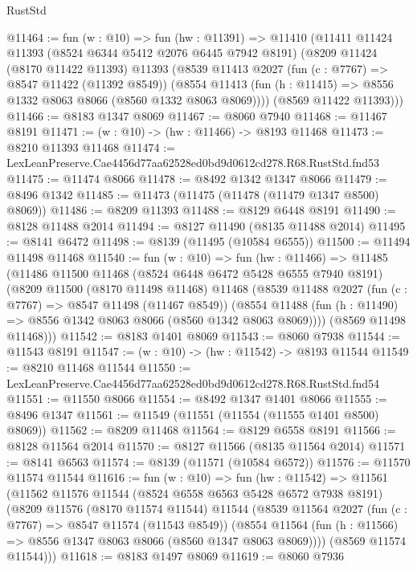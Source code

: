 \begin{lexlean}{RustStd}
\begin{coremodule}
@11464 := fun (w : @10) =>
  fun (hw : @11391) =>
  @11410
    (@11411
      @11424
      @11393
      (@8524 @6344 @5412 @2076 @6445 @7942 @8191)
      (@8209
        @11424
        (@8170 @11422 @11393)
        @11393
        (@8539
          @11413
          @2027
          (fun (c : @7767) => @8547 @11422 (@11392 @8549))
          (@8554 @11413 (fun (h : @11415) => @8556 @1332 @8063 @8066 (@8560 @1332 @8063 @8069))))
        (@8569 @11422 @11393)))
@11466 := @8183 @1347 @8069
@11467 := @8060 @7940
@11468 := @11467 @8191
@11471 := (w : @10) -> (hw : @11466) -> @8193 @11468
@11473 := @8210 @11393 @11468
@11474 := LexLeanPreserve.Cae4456d77aa62528ed0bd9d0612cd278.R68.RustStd.fnd53
@11475 := @11474 @8066
@11478 := @8492 @1342 @1347 @8066
@11479 := @8496 @1342
@11485 := @11473 (@11475 (@11478 (@11479 @1347 @8500) @8069))
@11486 := @8209 @11393
@11488 := @8129 @6448 @8191
@11490 := @8128 @11488 @2014
@11494 := @8127 @11490 (@8135 @11488 @2014)
@11495 := @8141 @6472
@11498 := @8139 (@11495 (@10584 @6555))
@11500 := @11494 @11498 @11468
@11540 := fun (w : @10) =>
  fun (hw : @11466) =>
  @11485
    (@11486
      @11500
      @11468
      (@8524 @6448 @6472 @5428 @6555 @7940 @8191)
      (@8209
        @11500
        (@8170 @11498 @11468)
        @11468
        (@8539
          @11488
          @2027
          (fun (c : @7767) => @8547 @11498 (@11467 @8549))
          (@8554 @11488 (fun (h : @11490) => @8556 @1342 @8063 @8066 (@8560 @1342 @8063 @8069))))
        (@8569 @11498 @11468)))
@11542 := @8183 @1401 @8069
@11543 := @8060 @7938
@11544 := @11543 @8191
@11547 := (w : @10) -> (hw : @11542) -> @8193 @11544
@11549 := @8210 @11468 @11544
@11550 := LexLeanPreserve.Cae4456d77aa62528ed0bd9d0612cd278.R68.RustStd.fnd54
@11551 := @11550 @8066
@11554 := @8492 @1347 @1401 @8066
@11555 := @8496 @1347
@11561 := @11549 (@11551 (@11554 (@11555 @1401 @8500) @8069))
@11562 := @8209 @11468
@11564 := @8129 @6558 @8191
@11566 := @8128 @11564 @2014
@11570 := @8127 @11566 (@8135 @11564 @2014)
@11571 := @8141 @6563
@11574 := @8139 (@11571 (@10584 @6572))
@11576 := @11570 @11574 @11544
@11616 := fun (w : @10) =>
  fun (hw : @11542) =>
  @11561
    (@11562
      @11576
      @11544
      (@8524 @6558 @6563 @5428 @6572 @7938 @8191)
      (@8209
        @11576
        (@8170 @11574 @11544)
        @11544
        (@8539
          @11564
          @2027
          (fun (c : @7767) => @8547 @11574 (@11543 @8549))
          (@8554 @11564 (fun (h : @11566) => @8556 @1347 @8063 @8066 (@8560 @1347 @8063 @8069))))
        (@8569 @11574 @11544)))
@11618 := @8183 @1497 @8069
@11619 := @8060 @7936

\end{coremodule}
\end{lexlean}
